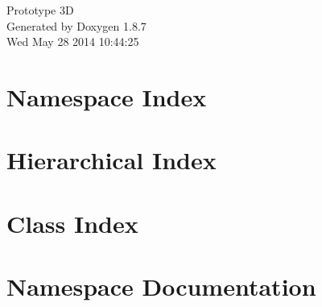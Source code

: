 \documentclass[twoside]{book}
\newcommand{\+}{\discretionary{\mbox{\scriptsize$\hookleftarrow$}}{}{}}
\newcommand{\clearemptydoublepage}{%
  \newpage{\pagestyle{empty}\cleardoublepage}%
}
\begin{document}
\hypersetup{pageanchor=false,
             bookmarks=true,
             bookmarksnumbered=true,
             pdfencoding=unicode
            }
\begin{titlepage}
\vspace*{7cm}
\begin{center}%
{\Large Prototype 3\+D }\\
\vspace*{1cm}
{\large Generated by Doxygen 1.8.7}\\
\vspace*{0.5cm}
{\small Wed May 28 2014 10:44:25}\\
\end{center}
\end{titlepage}
\clearemptydoublepage
\tableofcontents
\clearemptydoublepage
{}
\hypersetup{pageanchor=true}

\chapter{Namespace Index}

\chapter{Hierarchical Index}

\chapter{Class Index}

\chapter{Namespace Documentation}







\end{document}
